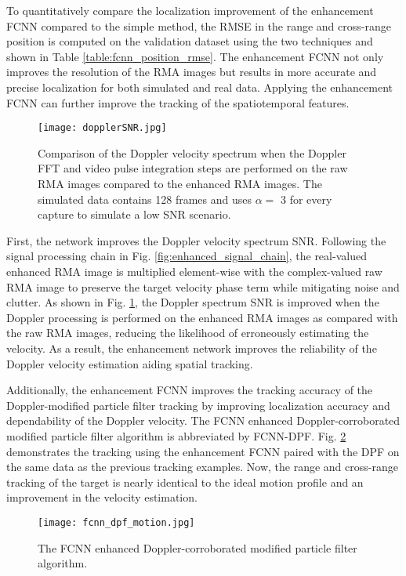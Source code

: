 \documentclass[10pt,journal,final]{IEEEtran}
\begin{document}
To quantitatively compare the localization improvement of the enhancement FCNN compared to the simple method, the RMSE in the range and cross-range position is computed on the validation dataset using the two techniques and shown in Table \ref{table:fcnn_position_rmse}. The enhancement FCNN not only improves the resolution of the RMA images but results in more accurate and precise localization for both simulated and real data. Applying the enhancement FCNN can further improve the tracking of the spatiotemporal features.

\begin{figure}[h]
	\centering
	\texttt{[image: dopplerSNR.jpg]}
	\caption{Comparison of the Doppler velocity spectrum when the Doppler FFT and video pulse integration steps are performed on the raw RMA images compared to the enhanced RMA images. The simulated data contains 128 frames and uses $\alpha = $ 3 for every capture to simulate a low SNR scenario.}
	\label{fig:doppler_snr}
\end{figure}

First, the network improves the Doppler velocity spectrum SNR. Following the signal processing chain in Fig. \ref{fig:enhanced_signal_chain}, the real-valued enhanced RMA image is multiplied element-wise with the complex-valued raw RMA image to preserve the target velocity phase term while mitigating noise and clutter. As shown in Fig. \ref{fig:doppler_snr}, the Doppler spectrum SNR is improved when the Doppler processing is performed on the enhanced RMA images as compared with the raw RMA images, reducing the likelihood of erroneously estimating the velocity. As a result, the enhancement network improves the reliability of the Doppler velocity estimation aiding spatial tracking.

Additionally, the enhancement FCNN improves the tracking accuracy of the Doppler-modified particle filter tracking by improving localization accuracy and dependability of the Doppler velocity. The FCNN enhanced Doppler-corroborated modified particle filter algorithm is abbreviated by FCNN-DPF. Fig. \ref{fig:fcnn_dpf_motion} demonstrates the tracking using the enhancement FCNN paired with the DPF on the same data as the previous tracking examples. Now, the range and cross-range tracking of the target is nearly identical to the ideal motion profile and an improvement in the velocity estimation.

\begin{figure}[h]
	\centering
	\texttt{[image: fcnn\_dpf\_motion.jpg]}
	\caption{The FCNN enhanced Doppler-corroborated modified particle filter algorithm.}
	\label{fig:fcnn_dpf_motion}
\end{figure}
\end{document}
